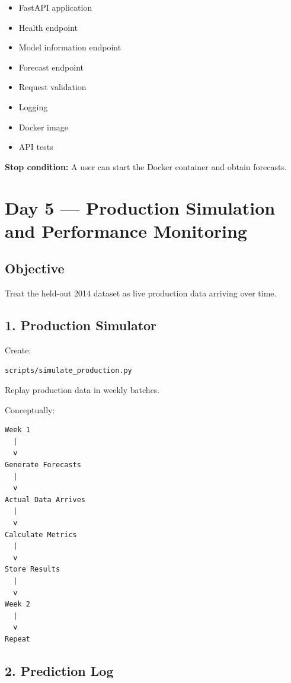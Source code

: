 \documentclass[11pt,a4paper]{article}
\newcommand{\done}{\textbf{\textcolor{codegreen}{✓}}}
\begin{document}
\begin{itemize}
    \item[\done] FastAPI application
    \item[\done] Health endpoint
    \item[\done] Model information endpoint
    \item[\done] Forecast endpoint
    \item[\done] Request validation
    \item[\done] Logging
    \item[\done] Docker image
    \item[\done] API tests
\end{itemize}

\textbf{Stop condition:} A user can start the Docker container and obtain forecasts.

\newpage


\section{Day 5 --- Production Simulation and Performance Monitoring}

\subsection{Objective}

Treat the held-out 2014 dataset as live production data arriving over time.

\subsection{1. Production Simulator}

Create:

\begin{lstlisting}
scripts/simulate_production.py
\end{lstlisting}

Replay production data in weekly batches.

Conceptually:

\begin{verbatim}
Week 1
  |
  v
Generate Forecasts
  |
  v
Actual Data Arrives
  |
  v
Calculate Metrics
  |
  v
Store Results
  |
  v
Week 2
  |
  v
Repeat
\end{verbatim}

\subsection{2. Prediction Log}
\end{document}
